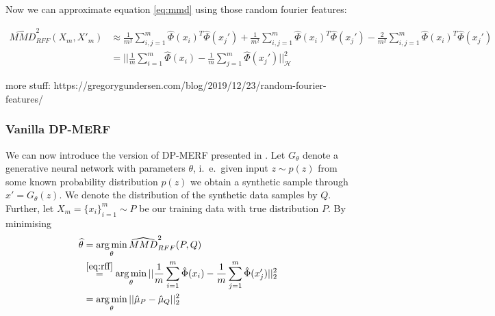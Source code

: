 Now we can approximate equation \ref{eq:mmd} using those random fourier features:

\begin{align} \label{eq:rff}
    \widehat{MMD}^2_{RFF}(X_m, X'_m) &\approx \frac{1}{m^2} \sum_{i,j=1}^m \hat{\Phi}(x_i)^T \hat{\Phi}(x_j') + \frac{1}{m^2} \sum_{i,j=1}^m \hat{\Phi}(x_i)^T \hat{\Phi}(x_j') - \frac{2}{m^2} \sum_{i,j=1}^m \hat{\Phi}(x_i)^T \hat{\Phi}(x_j') \nonumber \\
    &= || \frac{1}{m} \sum_{i=1}^m \hat{\Phi}(x_i) - \frac{1}{m} \sum_{j=1}^m \hat{\Phi}(x_j') ||_\mathcal{H}^2
\end{align}

more stuff: https://gregorygundersen.com/blog/2019/12/23/random-fourier-features/

\subsubsection{Vanilla DP-MERF}
We can now introduce the version of DP-MERF presented in \parencite{dpmerf}. Let $G_\theta$ denote a generative neural network with parameters $\theta$, i.\ e.\ given input $z \sim p(z)$ from some known probability distribution $p(z)$ we obtain a synthetic sample through $x' = G_\theta(z)$. We denote the distribution of the synthetic data samples by $Q$. Further, let $X_m = \{x_i\}_{i=1}^m \sim P$ be our training data with true distribution $P$. By minimising 
\begin{align}
    \widehat{\theta} &= \operatorname*{arg\,min}_\theta \widehat{MMD}^2_{RFF}(P, Q) \nonumber \\
    &\overset{\ref{eq:rff}}{=} \operatorname*{arg\,min}_\theta || \frac{1}{m} \sum_{i=1}^m \hat{\Phi}(x_i) - \frac{1}{m} \sum_{j=1}^m \hat{\Phi}(x_j') ||_2^2 \nonumber \\
    &= \operatorname*{arg\,min}_\theta || \hat{\mu}_P - \hat{\mu}_Q ||_2^2
\end{align}


